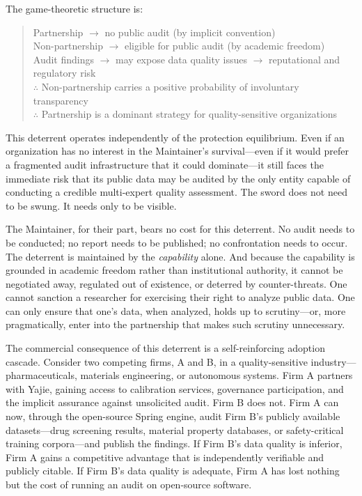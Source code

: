 \documentclass[12pt,a4paper]{ctexart}
\theoremstyle{definition}
\theoremstyle{remark}
\begin{document}
The game-theoretic structure is:
\begin{quote}
Partnership $\to$ no public audit (by implicit convention)\\
Non-partnership $\to$ eligible for public audit (by academic freedom)\\
Audit findings $\to$ may expose data quality issues $\to$ reputational and regulatory risk\\
$\therefore$ Non-partnership carries a positive probability of involuntary transparency\\
$\therefore$ Partnership is a dominant strategy for quality-sensitive organizations
\end{quote}

This deterrent operates independently of the protection equilibrium. Even if an organization has no interest in the Maintainer's survival—even if it would prefer a fragmented audit infrastructure that it could dominate—it still faces the immediate risk that its public data may be audited by the only entity capable of conducting a credible multi-expert quality assessment. The sword does not need to be swung. It needs only to be visible.

The Maintainer, for their part, bears no cost for this deterrent. No audit needs to be conducted; no report needs to be published; no confrontation needs to occur. The deterrent is maintained by the \textit{capability} alone. And because the capability is grounded in academic freedom rather than institutional authority, it cannot be negotiated away, regulated out of existence, or deterred by counter-threats. One cannot sanction a researcher for exercising their right to analyze public data. One can only ensure that one's data, when analyzed, holds up to scrutiny—or, more pragmatically, enter into the partnership that makes such scrutiny unnecessary.

The commercial consequence of this deterrent is a self-reinforcing adoption cascade. Consider two competing firms, A and B, in a quality-sensitive industry—pharmaceuticals, materials engineering, or autonomous systems. Firm A partners with Yajie, gaining access to calibration services, governance participation, and the implicit assurance against unsolicited audit. Firm B does not. Firm A can now, through the open-source Spring engine, audit Firm B's publicly available datasets—drug screening results, material property databases, or safety-critical training corpora—and publish the findings. If Firm B's data quality is inferior, Firm A gains a competitive advantage that is independently verifiable and publicly citable. If Firm B's data quality is adequate, Firm A has lost nothing but the cost of running an audit on open-source software.
\end{document}
